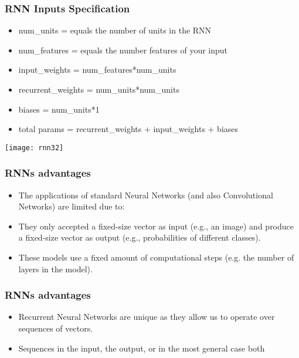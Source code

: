 \begin{frame}[fragile] \frametitle{RNN Inputs Specification}

\begin{itemize}
\item num\_units = equals the number of units in the RNN
\item num\_features = equals the number features of your input
\item input\_weights = num\_features*num\_units
\item recurrent\_weights = num\_units*num\_units
\item biases = num\_units*1
\item total params = recurrent\_weights + input\_weights + biases
\end{itemize}

\begin{center}
\texttt{[image: rnn32]}
\end{center}


\end{frame}


\begin{frame}[fragile] \frametitle{RNNs advantages}

\begin{itemize}
\item The applications of standard Neural Networks (and also Convolutional Networks) are limited due to:
\item They only accepted a fixed-size vector as input (e.g., an image) and produce a fixed-size vector as output (e.g., probabilities of different classes). 
\item These models use a fixed amount of computational steps (e.g. the number of layers in the model).
\end{itemize}
\end{frame}


\begin{frame}[fragile] \frametitle{RNNs advantages}

\begin{itemize}
\item Recurrent Neural Networks are unique as they allow us to operate over sequences of vectors.
\item Sequences in the input, the output, or in the most general case both
\end{itemize}
\end{frame}


